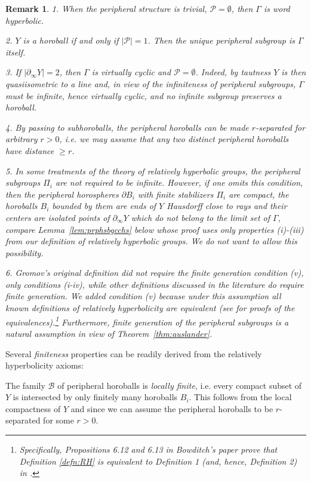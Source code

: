 \documentclass[12pt]{article}
\theoremstyle{boldplain}
\theoremstyle{bolddefinition}
\newtheorem{rem}[equation]{Remark}
\numberwithin{equation}{section}
\def\Ga{\Gamma}
\def\D{\partial}
\def\geo{\partial_{\infty}}
\begin{document}
\begin{rem}
\label{rem:rhdf}
1. When the peripheral structure is trivial, ${\mathcal P}=\emptyset$, then $\Ga$ is word hyperbolic.

2. $Y$ is a horoball if and only if $|{\mathcal P}|=1$.
Then the unique peripheral subgroup is $\Ga$ itself.


3. If $|\geo Y|=2$, then $\Ga$ is virtually cyclic and ${\mathcal P}=\emptyset$.
Indeed, by tautness $Y$ is then quasiisometric to a line and, in view of the infiniteness of peripheral subgroups,
$\Ga$ must be infinite, hence virtually cyclic,
and no infinite subgroup preserves a horoball.

4. By passing to subhoroballs, the peripheral horoballs can be made {\em $r$-separated}
for arbitrary $r>0$,
i.e. we may assume that any two distinct peripheral horoballs have distance $\geq r$.

5. In some treatments of the theory of relatively hyperbolic groups,
the peripheral subgroups $\Pi_i$ are not required to be infinite. 
However, if one omits this condition, 
then the peripheral horospheres $\D B_i$ with finite stabilizers $\Pi_i$ are compact,
the horoballs $B_i$ bounded by them are ends of $Y$ Hausdorff close to rays
and their centers are isolated points of $\geo Y$ which do not belong to the limit set of $\Ga$, 
compare Lemma~\ref{lem:prphsbgcchs} below whose proof uses only properties (i)-(iii) from our definition of relatively hyperbolic groups.
We do not want to allow this possibility. 

6. Gromov's original definition did not require the finite generation condition (v), only conditions (i-iv),
while other definitions discussed in the literature do require finite generation.
We added condition (v)
because under this assumption 
all known definitions of relatively hyperbolicity are equivalent (see \cite{Bowditch2012, Bumagin, Hruska} for proofs of the equivalences).\footnote{Specifically, Propositions 6.12 and 6.13 in Bowditch's paper \cite{Bowditch2012}
prove that Definition \ref{defn:RH} is equivalent to Definition 1 (and, hence, Definition 2) in   \cite{Bowditch2012}.}
Furthermore,  finite generation of the peripheral subgroups is a natural assumption in view of Theorem~\ref{thm:auslander}. 
\end{rem}

Several 
{\em finiteness} 
properties 
can be readily derived from the relatively hyperbolicity axioms:

The family ${\mathcal B}$ of peripheral horoballs is {\em locally finite},
i.e. every compact subset of $Y$ is intersected by only finitely many horoballs $B_i$.
This follows from the local compactness of $Y$ and since we can assume the peripheral horoballs to be $r$-separated for some $r>0$.
\end{document}
